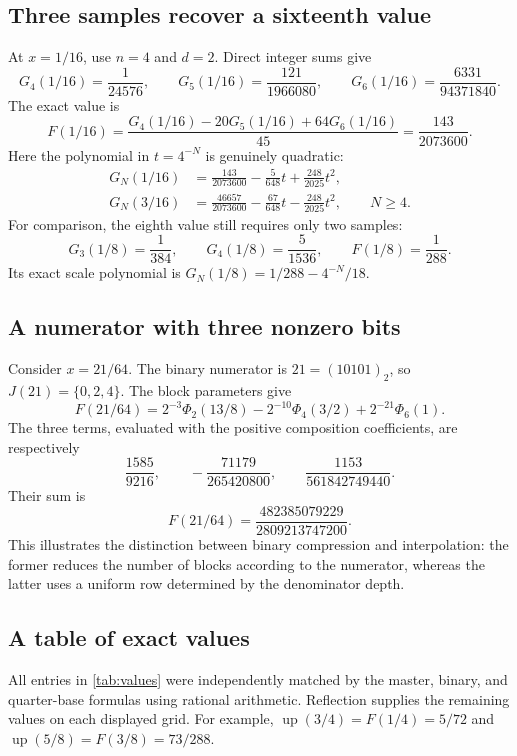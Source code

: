 \documentclass[11pt,a4paper]{article}
\numberwithin{equation}{section}
\theoremstyle{definition}
\theoremstyle{remark}
\newcommand{\up}{\operatorname{up}}
\begin{document}
\subsection{Three samples recover a sixteenth value}
At $x=1/16$, use $n=4$ and $d=2$. Direct integer sums give
\[
 G_4(1/16)=\frac1{24576},\qquad
 G_5(1/16)=\frac{121}{1966080},\qquad
 G_6(1/16)=\frac{6331}{94371840}.
\]
The exact value is
\begin{equation}
 F(1/16)=\frac{G_4(1/16)-20G_5(1/16)+64G_6(1/16)}{45}
        =\frac{143}{2073600}.
 \label{eq:example-sixteenth}
\end{equation}
Here the polynomial in $t=4^{-N}$ is genuinely quadratic:
\begin{align}
 G_N(1/16)&=\frac{143}{2073600}-\frac5{648}t
                         +\frac{248}{2025}t^2,\label{eq:sixteenth-poly}\\
 G_N(3/16)&=\frac{46657}{2073600}-\frac{67}{648}t
                         -\frac{248}{2025}t^2,
 \qquad N\ge4.\label{eq:three-sixteenth-poly}
\end{align}
For comparison, the eighth value still requires only two samples:
\[
 G_3(1/8)=\frac1{384},\qquad G_4(1/8)=\frac5{1536},
 \qquad F(1/8)=\frac1{288}.
\]
Its exact scale polynomial is $G_N(1/8)=1/288-4^{-N}/18$.

\subsection{A numerator with three nonzero bits}
Consider $x=21/64$. The binary numerator is $21=(10101)_2$, so $J(21)=\{0,2,4\}$. The block parameters give
\begin{equation}
 F(21/64)=2^{-3}\Phi_2(13/8)
          -2^{-10}\Phi_4(3/2)
          +2^{-21}\Phi_6(1).
 \label{eq:binary-example}
\end{equation}
The three terms, evaluated with the positive composition coefficients, are respectively
\[
 \frac{1585}{9216},\qquad
 -\frac{71179}{265420800},\qquad
 \frac{1153}{561842749440}.
\]
Their sum is
\begin{equation}
 F(21/64)=\frac{482385079229}{2809213747200}.
 \label{eq:value-21-64}
\end{equation}
This illustrates the distinction between binary compression and interpolation: the former reduces the number of blocks according to the numerator, whereas the latter uses a uniform row determined by the denominator depth.

\subsection{A table of exact values}
All entries in \cref{tab:values} were independently matched by the master, binary, and quarter-base formulas using rational arithmetic. Reflection supplies the remaining values on each displayed grid. For example, $\up(3/4)=F(1/4)=5/72$ and $\up(5/8)=F(3/8)=73/288$.
\end{document}
